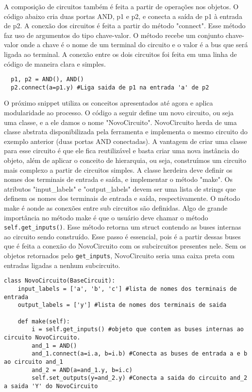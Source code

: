 A composição de circuitos também é feita a partir de operações nos objetos.
O código abaixo cria duas portas AND, p1 e p2, e conecta a saída de p1 à entrada de p2.
A conexão dos circuitos é feita a partir do método "connect".
Esse método faz uso de argumentos do tipo chave-valor.
O método recebe um conjunto chave-valor onde a chave é o nome de um terminal do circuito e o valor é a bus que será ligada ao terminal.
A conexão entre os dois circuitos foi feita em uma linha de código de maneira clara e simples.

\begin{lstlisting}
  p1, p2 = AND(), AND()
  p2.connect(a=p1.y) #Liga saida de p1 na entrada 'a' de p2
\end{lstlisting}

O próximo snippet utiliza os conceitos apresentados até agora e aplica modularidade ao processo.
O código a seguir define um novo circuito, ou seja uma classe, e a ele damos o nome "NovoCircuito".
NovoCircuito herda de uma classe abstrata disponibilizada pela ferramenta e implementa o mesmo circuito do exemplo anterior (duas portas AND conectadas).
A vantagem de criar uma classe para esse circuito é que ele fica reutilizável e basta criar uma nova instância do objeto, além de aplicar o conceito de hierarquia, ou seja, construímos um circuito mais complexo a partir de circuitos simples.
A classe herdeira deve definir os nomes dos terminais de entrada e saída, e implementar o método "make".
Os atributos "input\_labels" e "output\_labels" devem ser uma lista de strings que definem os nomes dos terminais de entrada e saída, respectivamente.
O método make é aonde as conexões entre sub circuitos são definidas.
Algo de grande importância no método make é que o usuário deve chamar o método \texttt{self.get\_inputs()}.
Esse método retorna um struct contendo as buses internas ao circuito sendo construído.
Esse passo é essencial, pois é a partir dessas buses que é feita a conexão do NovoCircuito com os subcircuitos presentes nele.
Sem os objetos retornados pelo \texttt{get\_inputs}, NovoCircuito seria uma caixa preta com entradas ligadas a nenhum subcircuito.

\begin{lstlisting}
class NovoCircuito(BaseCircuit):
    input_labels = ['a', 'b', 'c'] #lista de nomes dos terminais de entrada
    output_labels = ['y'] #lista de nomes dos terminais de saida

    def make(self):
        i = self.get_inputs() #objeto que contem as buses internas ao circuito NovoCircuito.
        and_1 = AND()
        and_1.connect(a=i.a, b=i.b) #Conecta as buses de entrada a e b ao circuito and_1
        and_2 = AND(a=and_1.y, b=i.c) 
        self.set_outputs(y=and_2.y) #Conecta a saida do circuito and_2 a saida 'Y' do NovoCircuito
\end{lstlisting}

